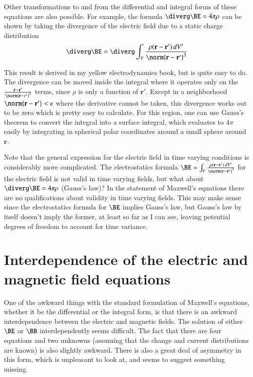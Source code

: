 \documentclass{article}      %
\begin{document}
Other transformations to and from the differential and integral forms of these
equations are also possible.  For example, the formula $\diverg \BE = 4\pi\rho$ 
can be shown by taking the divergence of the electric field due to a static
charge distribution
\begin{equation*}
\diverg \BE = \diverg \int_V{\frac{\rho (\mathbf{r - r'})\,dV'}{\norm{\mathbf r - \mathbf r'}^3}}
\end{equation*}

This result is derived in my yellow electrodynamics book, but is quite easy to 
do.  The divergence can be moved inside the integral where it operates only on 
the $\frac {\mathbf{r - r'}} {\norm{\mathbf r - r'}^3}$ terms, since $\rho$ is 
only a function of $\mathbf r'$.  
Except in a neighborhood 
$\norm{\mathbf{r - r'}} < \epsilon$
where the derivative cannot be taken,
this divergence works out to be zero which is pretty easy to calculate.
For this region, one can use Gauss's theorem to convert the 
integral into a surface integral, which evaluates to $4\pi$ easily by integrating in spherical polar coordinates
around a small sphere around $\mathbf r$.

Note that the general expression for the 
electric field in time varying conditions is considerably more complicated.
The electrostatics formula 
$\BE = \int_V{\frac{\rho (\mathbf{r - r'})\,dV'}{\norm{\mathbf r - \mathbf r'}^3}}$
for the electric field is not valid in time 
varying fields, but what 
about $\diverg \BE = 4\pi\rho$ (Gauss's law)?  In the statement of Maxwell's equations
there are no qualifications about validity in time varying fields.  This may
make sense since the electrostatics formula for $\BE$ implies Gauss's law, 
but Gauss's law by itself doesn't imply the former, at least so far as I can
see, leaving potential 
degrees of freedom to account for time variance.

\section{Interdependence of the electric and magnetic field equations}

One of the awkward things with the standard formulation of 
Maxwell's equations, whether it be the 
differential or the integral form, is that there 
is an awkward interdependence between the electric and magnetic fields. 
The solution of either $\BE$ or $\BB$ interdependently seems difficult.  The 
fact that there are four equations and two unknowns (assuming that the 
change and current distributions are known) is also slightly awkward.
There is also a great deal of asymmetry in this form, which is unpleasant
to look at, and seems to suggest something missing.
\end{document}
